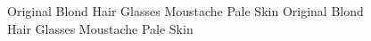 \begin{figure}[t]
    \centering
    \scriptsize
    	Original \quad\; Blond Hair \quad\; Glasses \quad\; Moustache \quad\; Pale Skin \quad\quad Original \quad\; Blond Hair \quad\; Glasses \quad\; Moustache \quad\; Pale Skin \\
    	\inc
\end{figure}
